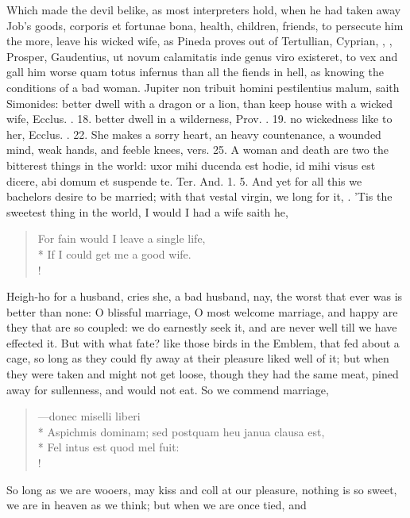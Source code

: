 Which made the devil belike, as most interpreters hold, when he had
taken away Job's goods, corporis et fortunae bona, health, children,
friends, to persecute him the more, leave his wicked wife, as Pineda
proves out of Tertullian, Cyprian, \Austin{}, \Chrysostom{}, Prosper,
Gaudentius, \etc{} ut novum calamitatis inde genus viro existeret, to vex
and gall him worse quam totus infernus than all the fiends in hell, as
knowing the conditions of a bad woman. Jupiter non tribuit homini
pestilentius malum, saith Simonides: better dwell with a dragon or a
lion, than keep house with a wicked wife, Ecclus. . 18. better dwell
in a wilderness, Prov. . 19. no wickedness like to her, Ecclus. .
22. She makes a sorry heart, an heavy countenance, a wounded mind, weak
hands, and feeble knees, vers. 25. A woman and death are two the
bitterest things in the world: uxor mihi ducenda est hodie, id mihi
visus est dicere, abi domum et suspende te. Ter. And. 1. 5. And yet for
all this we bachelors desire to be married; with that vestal virgin, we
long for it, . 'Tis
the sweetest thing in the world, I would I had a wife saith he,
%
\begin{verse}%
For fain would I leave a single life,\\*
If I could get me a good wife.\\!
\end{verse}%
%
Heigh-ho for a husband, cries she, a bad husband, nay, the worst that
ever was is better than none: O blissful marriage, O most welcome
marriage, and happy are they that are so coupled: we do earnestly seek
it, and are never well till we have effected it. But with what fate?
like those birds in the Emblem, that fed about a cage, so long as
they could fly away at their pleasure liked well of it; but when they
were taken and might not get loose, though they had the same meat,
pined away for sullenness, and would not eat. So we commend marriage,
%
\begin{latin}%
\begin{verse}%
---donec miselli liberi\\*
Aspichmis dominam; sed postquam heu janua clausa est,\\*
Fel intus est quod mel fuit:\\!
\end{verse}%
\end{latin}%
%
So long as we are wooers, may kiss and coll at our pleasure, nothing is
so sweet, we are in heaven as we think; but when we are once tied, and
